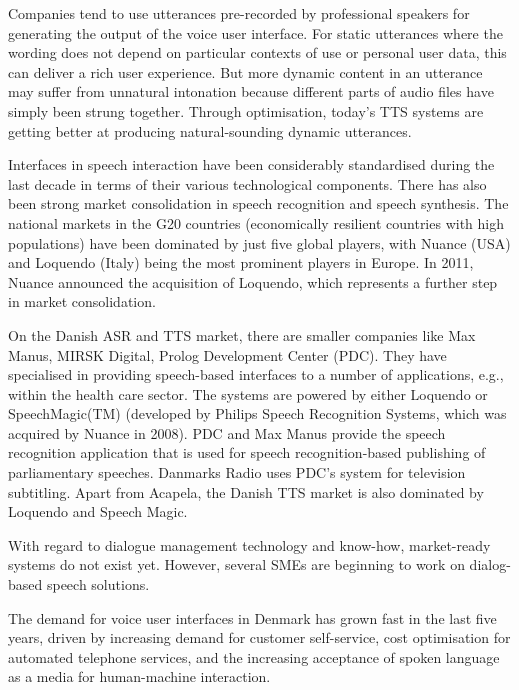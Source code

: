 \begin{multicols}{2}

Companies tend to use utterances pre-recorded by professional speakers for generating the output of the voice user interface. For static utterances where the wording does not depend on particular contexts of use or personal user data, this can deliver a rich user experience. But more dynamic content in an utterance may suffer from unnatural intonation because different parts of audio files have simply been strung together. Through optimisation, today’s TTS systems are getting better at producing natural-sounding dynamic utterances.

Interfaces in speech interaction have been considerably standardised during the last decade in terms of their various technological components. There has also been strong market consolidation in speech recognition and speech synthesis. The national markets in the G20 countries (economically resilient countries with high populations) have been dominated by just five global players, with Nuance (USA) and Loquendo (Italy) being the most prominent players in Europe. In 2011, Nuance announced the acquisition of Loquendo, which represents a further step in market consolidation.

On the Danish ASR and TTS market, there are smaller companies like Max Manus, MIRSK Digital, Prolog Development Center (PDC). They have specialised in providing speech-based interfaces to a number of applications, e.g., within the health care sector. The systems are powered by either Loquendo or SpeechMagic(TM) (developed by Philips Speech Recognition Systems, which was acquired by Nuance in 2008). PDC and Max Manus provide the speech recognition application that is used for speech recognition-based publishing of parliamentary speeches. Danmarks Radio uses PDC's system for television subtitling. Apart from Acapela, the Danish TTS market is also dominated by Loquendo and Speech Magic.

With regard to dialogue management technology and know-how, market-ready systems do not exist yet. However, several SMEs are beginning to work on dialog-based speech solutions.

The demand for voice user interfaces in Denmark has grown fast in the last five years, driven by increasing demand for customer self-service, cost optimisation for automated telephone services, and the increasing acceptance of spoken language as a media for human-machine interaction. 


\end{multicols}
